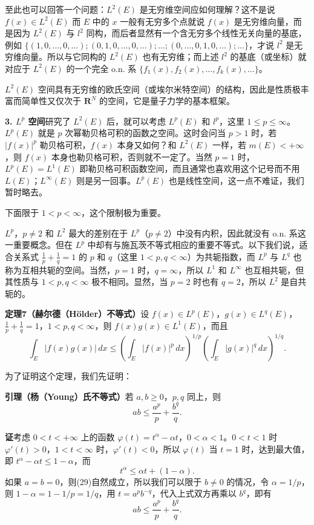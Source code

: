 至此也可以回答一个问题：$L^2(E)$ 是无穷维空间应如何理解？这不是说 $f(x)\in L^2(E)$ 而 $E$ 中的 $x$ 一般有无穷多个点就说 $f(x)$ 是无穷维向量，而是因为 $L^2(E)$ 与 $l^2$ 同构，而后者显然有一个含无穷多个线性无关向量的基底，例如 $\{(1,0,\ldots,0,\ldots);(0,1,0,\ldots,0,\ldots);\ldots;(0,\ldots,0,1,0,\ldots);\ldots\}$，才说 $l^2$ 是无穷维向量。所以与它同构的 $L^2(E)$ 也有无穷维；而上述 $l^2$ 的基底（或坐标）就对应于 $L^2(E)$ 的一个完全 o.n. 系 $\{f_1(x),f_2(x),\ldots,f_k(x),\ldots\}$。

$L^2(E)$ 空间具有无穷维的欧氏空间（或埃尔米特空间）的结构，因此是性质极丰富而简单性又仅次于 $\mathbf R^N$ 的空间，它是量子力学的基本框架。

\noindent\textbf{3. $L^p$ 空间}\quad 研究了 $L^2(E)$ 后，就可以考虑 $L^p(E)$ 和 $l^p$，这里 $1\le p\le\infty$。$L^p(E)$ 就是 $p$ 次幂勒贝格可积的函数之空间。这时会问当 $p>1$ 时，若 $|f(x)|^p$ 勒贝格可积，$f(x)$ 本身又如何？和 $L^2(E)$ 一样，若 $m(E)<+\infty$，则 $f(x)$ 本身也勒贝格可积，否则就不一定了。当然 $p=1$ 时，$L^p(E)=L^1(E)$ 即勒贝格可积函数空间，而且通常也喜欢用这个记号而不用 $L(E)$；$L^\infty(E)$ 则是另一回事。$L^p(E)$ 也是线性空间，这一点不难证，我们暂时略去。

下面限于 $1<p<\infty$，这个限制极为重要。

$L^p$，$p\ne2$ 和 $L^2$ 最大的差别在于 $L^p$（$p\ne2$）中没有内积，因此就没有 o.n. 系这一重要概念。但在 $L^p$ 中却有与施瓦茨不等式相应的重要不等式。以下我们说，适合关系式 $\frac1p+\frac1q=1$ 的 $p$ 和 $q$（这里 $1<p,q<\infty$）为共轭指数，而 $L^p$ 与 $L^q$ 也称为互相共轭的空间。当然，$p=1$ 时，$q=\infty$，所以 $L^1$ 和 $L^\infty$ 也互相共轭，但其性质与 $1<p,q<\infty$ 极不相同。显然，当 $p=2$ 时也有 $q=2$，所以 $L^2$ 是自共轭的。

\noindent\textbf{定理7（赫尔德（Hölder）不等式）}\quad 设 $f(x)\in L^p(E)$，$g(x)\in L^q(E)$，$\frac1p+\frac1q=1$，$1<p,q<\infty$，则 $f(x)g(x)\in L^1(E)$，而且
\begin{equation}
 \int_E|f(x)g(x)|\,dx\le\left(\int_E|f(x)|^p\,dx\right)^{1/p}\left(\int_E|g(x)|^q\,dx\right)^{1/q}.
 \tag{28}
\end{equation}

为了证明这个定理，我们先证明：

\noindent\textbf{引理（杨（Young）氏不等式）}\quad 若 $a,b\ge0$，$p,q$ 同上，则
\begin{equation}
 ab\le\frac{a^p}{p}+\frac{b^q}{q}.
 \tag{29}
\end{equation}

\noindent\textbf{证}\quad 考虑 $0<t<+\infty$ 上的函数 $\varphi(t)=t^\alpha-\alpha t$，$0<\alpha<1$。$0<t<1$ 时 $\varphi'(t)>0$，$1<t<\infty$ 时，$\varphi'(t)<0$，所以 $\varphi(t)$ 当 $t=1$ 时，达到最大值，即 $t^\alpha-\alpha t\le1-\alpha$，而
\[
 t^\alpha\le\alpha t+(1-\alpha).
\]
如果 $a=b=0$，则(29)自然成立，所以我们可以限于 $b\ne0$ 的情况，令 $\alpha=1/p$，则 $1-\alpha=1-1/p=1/q$，用 $t=a^pb^{-q}$，代入上式双方再乘以 $b^q$，即有
\[
 ab\le\frac{a^p}{p}+\frac{b^q}{q}.
\]

